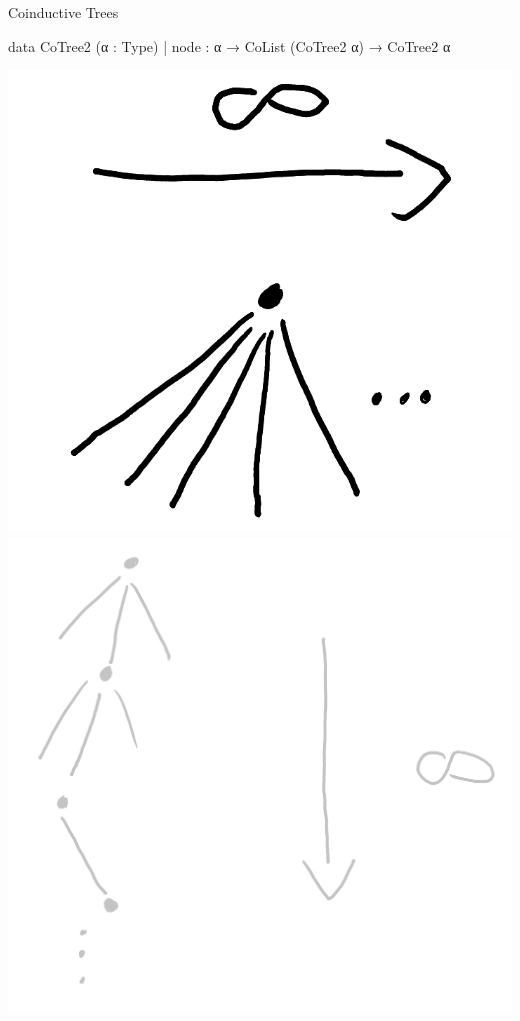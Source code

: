 \documentclass[t,12pt]{beamer}
\begin{document}


\begin{frame}[fragile]{Coinductive Trees}
    \vfill
\begin{leancode}
data CoTree2 (α : Type)
  | node : α → CoList (CoTree2 α) → CoTree2 α
\end{leancode}

\medskip

{
    \hfill
    \includegraphics[scale=0.1]{tree_inf_wide.png}
    \hspace*{2.6cm}
    \includegraphics[scale=0.07]{tree_inf_deep_grey.png}    
    \hfill
}



     
\end{frame}
    
\end{document}
